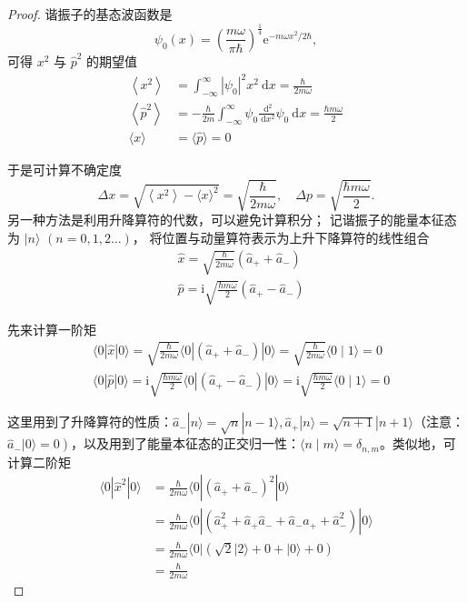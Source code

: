 \begin{proof}
    谐振子的基态波函数是
    \[\psi_{0}(x)=\left(\frac{m \omega}{\pi \hbar}\right)^{\frac{1}{4}} \mathrm{e}^{-m \omega x^{2} / 2 \hbar},\]
    可得 $x^{2}$ 与 $\hat{p}^{2}$ 的期望值
$$
\begin{aligned}
\left\langle x^{2}\right\rangle & =\int_{-\infty}^{\infty}|\psi_{0}|^{2} x^{2} \mathrm{~d} x=\frac{\hbar}{2 m \omega} \\
\left\langle\hat{p}^{2}\right\rangle & =-\frac{\hbar}{2 m} \int_{-\infty}^{\infty} \psi_{0} \frac{\mathrm{~d}^{2}}{\mathrm{~d} x^{2}} \psi_{0} \mathrm{~d} x=\frac{\hbar m \omega}{2} \\
\langle x\rangle & =\langle\hat{p}\rangle=0
\end{aligned}
$$

于是可计算不确定度
\[\Delta x=\sqrt{\left\langle x^{2}\right\rangle-\langle x\rangle^{2}}=\sqrt{\frac{\hbar}{2 m \omega}}, 
\quad \Delta p=\sqrt{\frac{\hbar m \omega}{2}}.\]
另一种方法是利用升降算符的代数，可以避免计算积分；
记谐振子的能量本征态为 $|n\rangle$ $(n=0,1,2 \ldots)$，
将位置与动量算符表示为上升下降算符的线性组合
$$
\begin{aligned}
& \hat{x}=\sqrt{\frac{\hbar}{2 m \omega}}\left(\hat{a}_{+}+\hat{a}_{-}\right) \\
& \hat{p}=\mathrm{i} \sqrt{\frac{\hbar m \omega}{2}}\left(\hat{a}_{+}-\hat{a}_{-}\right)
\end{aligned}
$$

先来计算一阶矩
$$
\begin{aligned}
& \langle 0| \hat{x}|0\rangle=\sqrt{\frac{\hbar}{2 m \omega}}\langle 0|\left(\hat{a}_{+}+\hat{a}_{-}\right)|0\rangle=\sqrt{\frac{\hbar}{2 m \omega}}\langle 0 \mid 1\rangle=0 \\
& \langle 0| \hat{p}|0\rangle=\mathrm{i} \sqrt{\frac{\hbar m \omega}{2}}\langle 0|\left(\hat{a}_{+}-\hat{a}_{-}\right)|0\rangle=\mathrm{i} \sqrt{\frac{\hbar m \omega}{2}}\langle 0 \mid 1\rangle=0
\end{aligned}
$$

这里用到了升降算符的性质：$\hat{a}_{-}|n\rangle=\sqrt{n}|n-1\rangle, \hat{a}_{+}|n\rangle=\sqrt{n+1}|n+1\rangle$（注意：
$\left.\hat{a}_{-}|0\rangle=0\right)$，以及用到了能量本征态的正交归一性：$\langle n \mid m\rangle=\delta_{n, m}$。类似地，可计算二阶矩
$$
\begin{aligned}
\langle 0| \hat{x}^{2}|0\rangle & =\frac{\hbar}{2 m \omega}\langle 0|\left(\hat{a}_{+}+\hat{a}_{-}\right)^{2}|0\rangle \\
& =\frac{\hbar}{2 m \omega}\langle 0|\left(\hat{a}_{+}^{2}+\hat{a}_{+} \hat{a}_{-}+\hat{a}_{-} \hat{a}_{+}+\hat{a}_{-}^{2}\right)|0\rangle \\
& =\frac{\hbar}{2 m \omega}\langle 0|(\sqrt{2}|2\rangle+0+|0\rangle+0) \\
& =\frac{\hbar}{2 m \omega}
\end{aligned}
$$


\end{proof}
